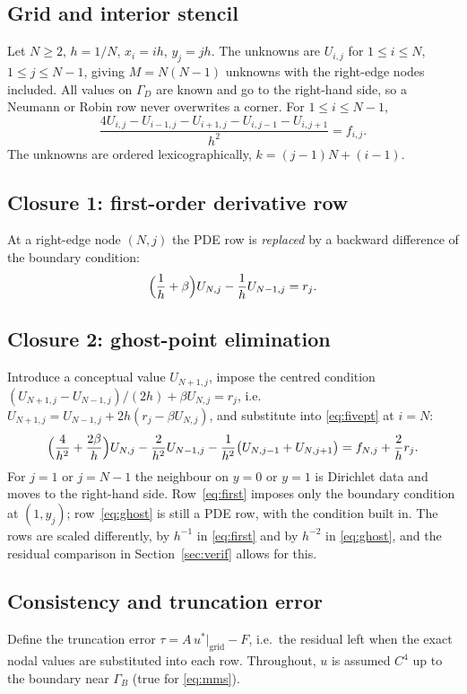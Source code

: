 \documentclass[11pt,a4paper]{article}
\theoremstyle{palplain}
\theoremstyle{paldef}
\theoremstyle{palremark}
\newcommand{\GD}{\Gamma_D}
\newcommand{\GB}{\Gamma_B}
\begin{document}
\subsection{Grid and interior stencil}
Let $N\ge2$, $h=1/N$, $x_i=ih$, $y_j=jh$. The unknowns are $U_{i,j}$ for $1\le i\le N$,
$1\le j\le N-1$, giving $M=N(N-1)$ unknowns with the right-edge nodes included. All values on
$\GD$ are known and go to the right-hand side, so a Neumann or Robin row never overwrites a
corner. For $1\le i\le N-1$,
\begin{equation}\label{eq:fivept}
\frac{4U_{i,j}-U_{i-1,j}-U_{i+1,j}-U_{i,j-1}-U_{i,j+1}}{h^2}=f_{i,j}.
\end{equation}
The unknowns are ordered lexicographically, $k=(j-1)N+(i-1)$.

\subsection{Closure 1: first-order derivative row}
At a right-edge node $(N,j)$ the PDE row is \emph{replaced} by a backward difference of
the boundary condition:
\begin{equation}\label{eq:first}
\Bigl(\frac1h+\beta\Bigr)U_{N,j}-\frac1h U_{N-1,j}=r_j .
\end{equation}

\subsection{Closure 2: ghost-point elimination}
Introduce a conceptual value $U_{N+1,j}$, impose the centred condition
$(U_{N+1,j}-U_{N-1,j})/(2h)+\beta U_{N,j}=r_j$, i.e.\
$U_{N+1,j}=U_{N-1,j}+2h(r_j-\beta U_{N,j})$, and substitute into \eqref{eq:fivept} at $i=N$:
\begin{equation}\label{eq:ghost}
\Bigl(\frac4{h^2}+\frac{2\beta}h\Bigr)U_{N,j}-\frac2{h^2}U_{N-1,j}
-\frac1{h^2}\bigl(U_{N,j-1}+U_{N,j+1}\bigr)=f_{N,j}+\frac{2}{h}r_j .
\end{equation}
For $j=1$ or $j=N-1$ the neighbour on $y=0$ or $y=1$ is Dirichlet data and moves to
the right-hand side. Row~\eqref{eq:first} imposes only the boundary condition at $(1,y_j)$;
row~\eqref{eq:ghost} is still a PDE row, with the condition built in. The rows are
scaled differently, by $h^{-1}$ in \eqref{eq:first} and by $h^{-2}$ in \eqref{eq:ghost}, and the
residual comparison in Section~\ref{sec:verif} allows for this.

\subsection{Consistency and truncation error}
Define the truncation error $\tau=A\,u^*|_{\text{grid}}-F$, i.e.\ the residual left when the exact
nodal values are substituted into each row. Throughout, $u$ is assumed $C^4$ up to the
boundary near $\GB$ (true for \eqref{eq:mms}).
\end{document}
